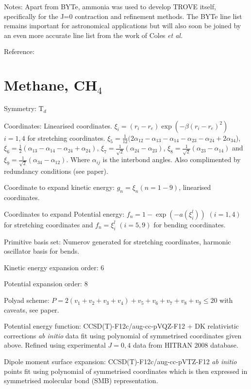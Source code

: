Notes: Apart from BYTe, ammonia was used to develop TROVE itself, specifically for the J=0 contraction and refinement methods.
The BYTe line list remains important for astronomical applications but will also soon be joined by an even more accurate
line list from the work of Coles \textit{et al.} \cite{jtNH3PES,jtNH3DMS}

Reference: \cite{jt466,jt500,jt503}


\section{Methane, CH$_4$}

Symmetry: T$_d$

Coordinates: Linearised coordinates. $\xi_i = (r_i - r_e) \exp(-\beta(r_i - r_e)^2)$ $i = 1,4$ for stretching coordinates.
 $\xi_5 = \frac{1}{12}(2\alpha_{12} - \alpha_{13} - \alpha_{14} - \alpha_{23} - \alpha_{24} + 2\alpha_{34}$),
 $\xi_6 = \frac{1}{2}(\alpha_{13} - \alpha_{14} - \alpha_{24} + \alpha_{24})$, $\xi_7 = \frac{1}{\sqrt{2}}(\alpha_{24} 
 - \alpha_{23})$, $\xi_8 = \frac{1}{\sqrt{2}}(\alpha_{23} - \alpha_{14})$ and $\xi_9 = \frac{1}{\sqrt{2}}(\alpha_{34}
 - \alpha_{12})$. Where $\alpha_{ij}$ is the interbond angles. Also complimented by redundancy conditions (see paper).   

Coordinate to expand kinetic energy: $g_n = \xi_n (n=1-9)$, linearised coordinates.

Coordinates to expand Potential energy: $f_n = 1 - \exp(-a(\xi_i^l))$ $(i = 1, 4)$ for stretching coordinates and
$f_n = \xi_i^l$ $(i = 5, 9)$ for bending coordinates.

Primitive basis set: Numerov generated for stretching coordinates, harmonic oscillator basis for bends.

Kinetic energy expansion order: 6

Potential expansion order: 8

Polyad scheme: $P = 2(v_1 + v_2 + v_3 + v_4) + v_5 + v_6 + v_7 + v_8 + v_9 \leq 20$ with caveats, see paper.

Potential energy function:  CCSD(T)-F12c/aug-cc-pVQZ-F12 + DK relativistic corrections \textit{ab initio} data fit using 
polynomial of symmetrised coordinates given above. Refined using experimental $J = 0, 4$ data from HITRAN 2008 database.

Dipole moment surface expansion: CCSD(T)-F12c/aug-cc-pVTZ-F12 \textit{ab initio} points fit using polynomial of 
symmetrised coordinates which is then expressed in symmetrised molecular bond (SMB) representation. 

